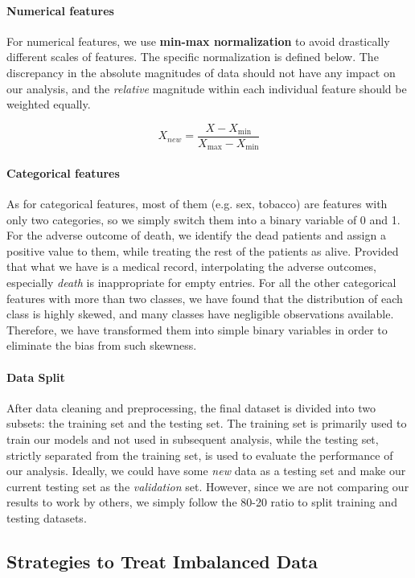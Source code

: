 \documentclass{article}
\begin{document}
\paragraph{Numerical features}
For numerical features, we use \textbf{min-max normalization} to avoid drastically different scales of features. The specific normalization is defined below. The discrepancy in the absolute magnitudes of data should not have any impact on our analysis, and the \textit{relative} magnitude within each individual feature should be weighted equally. 

$$
X_{new}=\frac{X-X_{\min}}{X_{\max}-X_{\min}}
$$

\paragraph{Categorical features}
As for categorical features, most of them (e.g. sex, tobacco) are features with only two categories, so we simply switch them
into a binary variable of 0 and 1. For the adverse outcome of death, we identify the dead patients and assign a positive value to them, while treating the rest of the patients as alive. Provided that what we have is a medical record, interpolating the adverse outcomes, especially \textit{death} is inappropriate for empty entries. For all the other categorical features with more than two classes, we have found that the distribution of each class is highly skewed, and many classes have negligible observations available. Therefore, we have transformed them into simple binary variables in order to eliminate the bias from such skewness. 

\paragraph{Data Split}

After data cleaning and preprocessing, the final dataset is divided into two subsets: the training set and the testing set. The training set is primarily used to train our models and not used in subsequent analysis, while the testing set, strictly separated from the training set, is used to evaluate the performance of our analysis. Ideally, we could have some \textit{new} data as a testing set and make our current testing set as the \textit{validation} set. However, since we are not comparing our results to work by others, we simply follow the 80-20 ratio to split training and testing datasets.

\subsection{Strategies to Treat Imbalanced Data \cite{5128907}}
\end{document}
